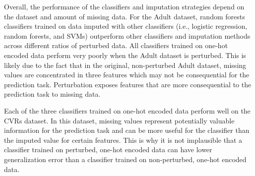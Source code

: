 \documentclass[10pt]{book}
\theoremstyle{definition}
\begin{document}
Overall, the performance of the classifiers and imputation strategies depend on the dataset and amount of missing data. For the Adult dataset, random forests classifiers trained on data imputed with other classifiers (i.e., logistic regression, random forests, and SVMs) outperform other classifiers and imputation methods across different ratios of perturbed data. All classifiers trained on one-hot encoded data perform very poorly when the Adult dataset is perturbed. This is likely due to the fact that in the original, non-perturbed Adult dataset, missing values are concentrated in three features which may not be consequential for the prediction task. Perturbation exposes features that are more consequential to the prediction task to missing data. 

Each of the three classifiers trained on one-hot encoded data perform well on the CVRs dataset. In this dataset, missing values represent potentially valuable information for the prediction task and can be more useful for the classifier than the imputed value for certain features. This is why it is not implausible that a classifier trained on perturbed, one-hot encoded data can have lower generalization error than a classifier trained on non-perturbed, one-hot encoded data. 
\end{document}
